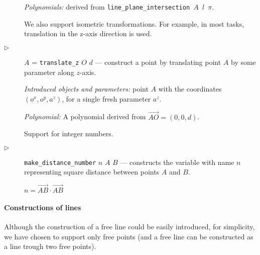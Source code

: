 \documentclass{article}
\begin{document}
\begin{description}
  {\em Polynomials:} derived from {\tt line\_plane\_intersection $A$ $l$ $\pi$}.

\bigskip

We also support isometric transformations. For example, in most tasks,
translation in the z-axis direction is used.

\item[$\triangleright$]  $A$ = {\tt translate\_z} $O$ $d$ --- construct a
  point by translating point $A$ by some parameter along $z$-axis.

  {\em Introduced objects and parameters:} point $A$ with the
  coordinates $(o^x, o^y, a^z)$, for a single fresh parameter $a^z$.

  {\em Polynomial:} A polynomial derived from
  $\overrightarrow{AO} = (0, 0, d)$.

\bigskip
 
Support for integer numbers.

\item[$\triangleright$] {\tt make\_distance\_number} $n$ $A$ $B$ ---
  constructs the variable with name $n$ representing square distance
  between points $A$ and $B$.

  $n = \overrightarrow{AB} \cdot \overrightarrow{AB}$
\end{description}


\paragraph{Constructions of lines}
Although the construction of a free line could be easily introduced,
for simplicity, we have chosen to support only free points (and a free
line can be constructed as a line trough two free points).
\end{document}

